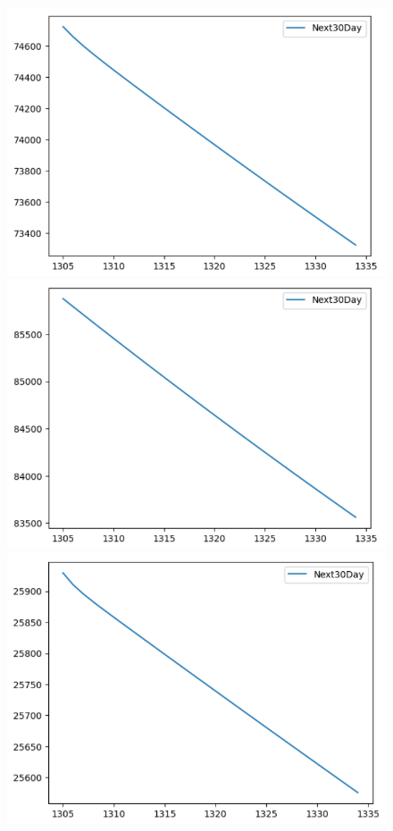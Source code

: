 \begin{figure}[H]
\begin{minipage}{0.15\textwidth}
    \includegraphics[width=1\textwidth]{resources/chapter-5/newdata/predicted/VCB_VARMA_8-2_30days.png}
    \end{minipage}
    \hfill
        \begin{minipage}{0.15\textwidth}
    \centering
    \includegraphics[width=1\textwidth]{resources/chapter-5/newdata/predicted/VCB_VARMA_9-1_30days.png}
    \end{minipage}
    \hfill
    \begin{minipage}{0.15\textwidth}
    \centering
    \includegraphics[width=1\textwidth]{resources/chapter-5/newdata/predicted/EIB_VARMA_7-3_30days.png}

\end{minipage}
\end{figure}
